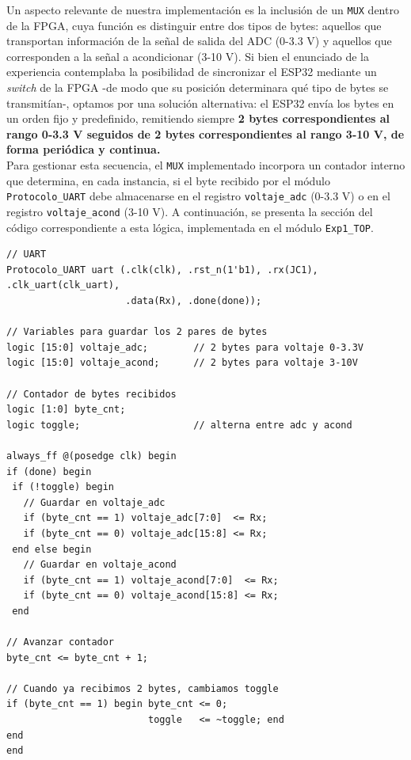 \documentclass[letterpaper, 12pt]{article}
\begin{document}
Un aspecto relevante de nuestra implementación es la inclusión de un \texttt{MUX} dentro de la FPGA, cuya función es distinguir entre dos tipos de bytes: aquellos que transportan información de la señal de salida del ADC (0-3.3 V) y aquellos que corresponden a la señal a acondicionar (3-10 V). Si bien el enunciado de la experiencia contemplaba la posibilidad de sincronizar el ESP32 mediante un \textit{switch} de la FPGA -de modo que su posición determinara qué tipo de bytes se transmitían-, optamos por una solución alternativa: el ESP32 envía los bytes en un orden fijo y predefinido, remitiendo siempre \textbf{2 bytes correspondientes al rango 0-3.3 V seguidos de 2 bytes correspondientes al rango 3-10 V, de forma periódica y continua.}\\

Para gestionar esta secuencia, el \texttt{MUX} implementado incorpora un contador interno que determina, en cada instancia, si el byte recibido por el módulo \texttt{Protocolo\_UART} debe almacenarse en el registro \texttt{voltaje\_adc} (0-3.3 V) o en el registro \texttt{voltaje\_acond} (3-10 V). A continuación, se presenta la sección del código correspondiente a esta lógica, implementada en el módulo \texttt{Exp1\_TOP}.

\begin{lstlisting}
// UART
Protocolo_UART uart (.clk(clk), .rst_n(1'b1), .rx(JC1), .clk_uart(clk_uart),
                     .data(Rx), .done(done));

// Variables para guardar los 2 pares de bytes
logic [15:0] voltaje_adc;        // 2 bytes para voltaje 0-3.3V
logic [15:0] voltaje_acond;      // 2 bytes para voltaje 3-10V

// Contador de bytes recibidos
logic [1:0] byte_cnt;
logic toggle;                    // alterna entre adc y acond

always_ff @(posedge clk) begin
if (done) begin 
 if (!toggle) begin
   // Guardar en voltaje_adc
   if (byte_cnt == 1) voltaje_adc[7:0]  <= Rx;
   if (byte_cnt == 0) voltaje_adc[15:8] <= Rx;
 end else begin
   // Guardar en voltaje_acond
   if (byte_cnt == 1) voltaje_acond[7:0]  <= Rx;
   if (byte_cnt == 0) voltaje_acond[15:8] <= Rx;
 end

// Avanzar contador
byte_cnt <= byte_cnt + 1;

// Cuando ya recibimos 2 bytes, cambiamos toggle
if (byte_cnt == 1) begin byte_cnt <= 0;
                         toggle   <= ~toggle; end
end
end
\end{lstlisting}
\end{document}
